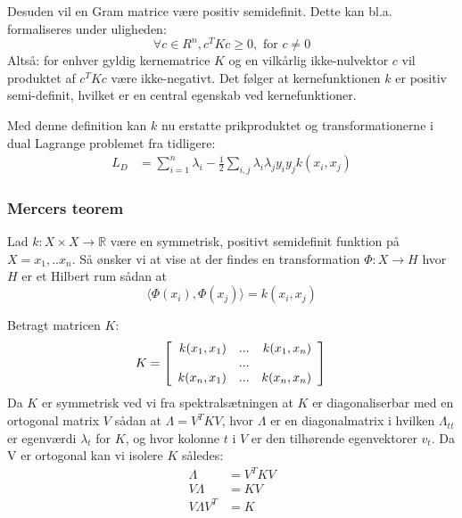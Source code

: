 \documentclass{article}
\begin{document}
Desuden vil en Gram matrice være positiv semidefinit. Dette kan bl.a. formaliseres under uligheden:
\begin{equation}
\forall c\in R^n,c^TKc\geq 0,\text{ for }c\neq 0
\end{equation}
Altså: for enhver gyldig kernematrice $K$ og en vilkårlig ikke-nulvektor $c$ vil produktet af $c^TKc$ være ikke-negativt. Det følger at kernefunktionen $k$ er positiv semi-definit, hvilket er en central egenskab ved kernefunktioner.

Med denne definition kan $k$ nu erstatte prikproduktet og transformationerne i dual Lagrange problemet fra tidligere:
\begin{align*}
L_D&=\sum_{i=1}^{n}\lambda_i-\frac{1}{2}\sum_{i,j}\lambda_i\lambda_j y_iy_jk(x_i,x_j)
\end{align*}


\subsubsection{Mercers teorem}
Lad $k:X\times X\rightarrow \mathbb{R}$ være en symmetrisk, positivt semidefinit funktion på $X={x_1,..x_n}$. Så ønsker vi at vise at der findes en transformation $\Phi:X\rightarrow H$ hvor $H$ er et Hilbert rum sådan at 
\begin{equation}
\label{eq:mercers}
\langle\Phi(x_i),\Phi(x_j)\rangle=k(x_i,x_j)
\end{equation}

Betragt matricen $K:$
\begin{equation}
K=\left[\begin{array}{r r r}
k(x_1,x_1) & ... &k(x_1,x_n)\\
& ... & \\
k(x_n,x_1) & ... &k(x_n,x_n)\\
\end{array}\right]\\
\end{equation}
Da $K$ er symmetrisk ved vi fra spektralsætningen at $K$ er diagonaliserbar med en ortogonal matrix $V$ sådan at $\Lambda=V^TKV$, hvor $\Lambda$ er en diagonalmatrix i hvilken $\Lambda_{tt}$ er egenværdi $\lambda_t$ for $K$, og hvor kolonne $t$ i $V$ er den tilhørende egenvektorer $v_t$. Da V er ortogonal kan vi isolere $K$ således:
\begin{align}
\Lambda &= V^TKV\\
V\Lambda &= KV\\
V\Lambda V^T &= K
\end{align}
\end{document}
